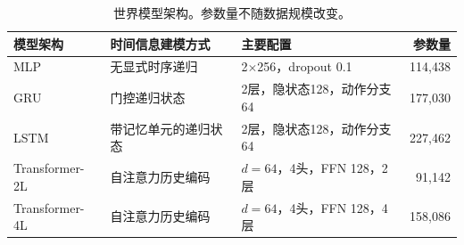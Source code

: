 
\begin{table}[H]
\centering
\caption{世界模型架构。参数量不随数据规模改变。}
\label{tab:architectures}
\small
\begin{tabularx}{\textwidth}{lXXr}
\toprule
模型架构 & 时间信息建模方式 & 主要配置 & 参数量 \\
\midrule
MLP & 无显式时序递归 & 2$\times$256，dropout 0.1 & 114,438 \\
GRU & 门控递归状态 & 2层，隐状态128，动作分支64 & 177,030 \\
LSTM & 带记忆单元的递归状态 & 2层，隐状态128，动作分支64 & 227,462 \\
Transformer-2L & 自注意力历史编码 & $d=64$，4头，FFN 128，2层 & 91,142 \\
Transformer-4L & 自注意力历史编码 & $d=64$，4头，FFN 128，4层 & 158,086 \\
\bottomrule
\end{tabularx}
\end{table}
